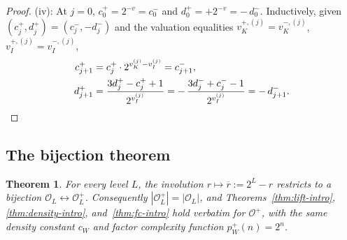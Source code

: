 \documentclass[11pt,reqno]{amsart}
\theoremstyle{plain}
\newtheorem{theorem}{Theorem}[section]
\theoremstyle{definition}
\theoremstyle{remark}
\newcommand{\Obs}{\mathcal{O}}
\newcommand{\vk}{v_{K}}
\newcommand{\vi}{v_{I}}
\begin{document}
\begin{proof}
(iv): At $j = 0$, $c_0^{+} = 2^{-v} = c_0^{-}$ and
$d_0^{+} = +2^{-v} = -\, d_0^{-}$. Inductively, given
$(c_j^{+}, d_j^{+}) = (c_j^{-}, -d_j^{-})$ and the valuation equalities
$\vk^{+,(j)} = \vk^{-,(j)}$, $\vi^{+,(j)} = \vi^{-,(j)}$,
\begin{align*}
c_{j+1}^{+} &= c_j^{+} \cdot 2^{\vk^{(j)} - \vi^{(j)}} = c_{j+1}^{-}, \\
d_{j+1}^{+} &= \frac{3 d_j^{+} - c_j^{+} + 1}{2^{\vi^{(j)}}}
  = -\,\frac{3 d_j^{-} + c_j^{-} - 1}{2^{\vi^{(j)}}}
  = -\, d_{j+1}^{-}. \qedhere
\end{align*}
\end{proof}

\subsection{The bijection theorem}

\begin{theorem}\label{thm:tplus-bijection}
For every level $L$, the involution $r \mapsto \overline{r} := 2^L - r$
restricts to a bijection $\Obs_L \leftrightarrow \Obs_L^{+}$.
Consequently $|\Obs_L^{+}| = |\Obs_L|$, and
Theorems~\ref{thm:lift-intro}, \ref{thm:density-intro}, and~\ref{thm:fc-intro}
hold verbatim for $\Obs^{+}$, with the same density constant $c_W$ and
factor complexity function $p_W^{+}(n) = 2^n$.
\end{theorem}
\end{document}
